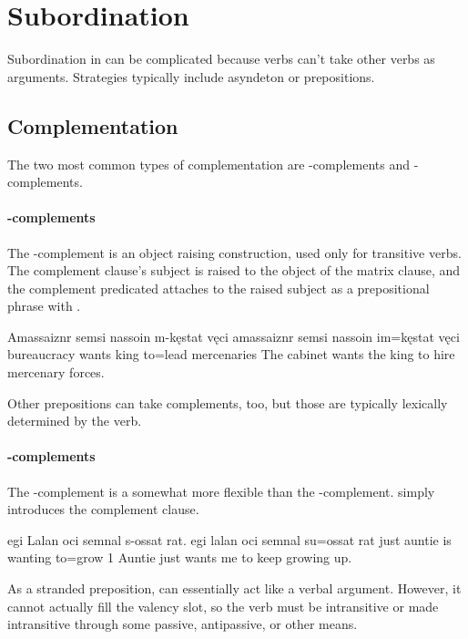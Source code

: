 \section{Subordination}
Subordination in \langname{} can be complicated because verbs can't take other verbs as arguments. Strategies typically include asyndeton or prepositions.

\subsection{Complementation}
The two most common types of complementation are -complements and -complements.

\paragraph{-complements}
The -complement is an object raising construction, used only for transitive verbs. The complement clause's subject is raised to the object of the matrix clause, and the complement predicated attaches to the raised subject as a prepositional phrase with .

\begin{example}
    \script Amassaiznr semsi nassoin m-kęstat vęci
    \bits amassaiznr semsi nassoin im=kęstat vęci
    \gloss bureaucracy wants king to=lead mercenaries
    \tr The cabinet wants the king to hire mercenary forces.
\end{example}

Other prepositions can take complements, too, but those are typically lexically determined by the verb.

\paragraph{-complements}
The -complement is a somewhat more flexible than the -complement.  simply introduces the complement clause.

\begin{example}
    \script egi Lalan oci semnal s-ossat rat.
    \bits egi  lalan  oci semnal  su=ossat rat
    \gloss just auntie is wanting to=grow 1
    \tr Auntie just wants me to keep growing up.
\end{example}

As a stranded preposition,  can essentially act like a verbal argument. However, it cannot actually fill the valency slot, so the verb must be intransitive or made intransitive through some passive, antipassive, or other means.

